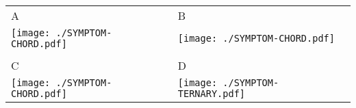 \documentclass[border = 1cm]{standalone}
\begin{document}




\begin{tabular}{m{10cm}m{10cm}}
    \Huge{A} & \Huge{B} \\
    \texttt{[image: ./SYMPTOM-CHORD.pdf]} & \texttt{[image: ./SYMPTOM-CHORD.pdf]} \\
    & \\
    \Huge{C}& \Huge{D} \\
    \texttt{[image: ./SYMPTOM-CHORD.pdf]} & 
    \texttt{[image: ./SYMPTOM-TERNARY.pdf]}
\end{tabular}


\end{document}
